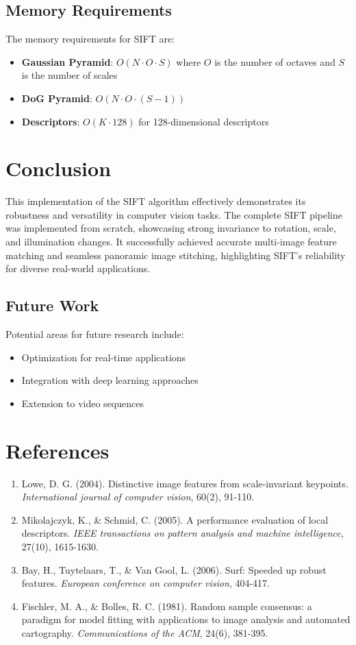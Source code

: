 \documentclass[12pt,a4paper]{article}
\begin{document}
\subsection{Memory Requirements}

The memory requirements for SIFT are:
\begin{itemize}
    \item \textbf{Gaussian Pyramid}: $O(N \cdot O \cdot S)$ where $O$ is the number of octaves and $S$ is the number of scales
    \item \textbf{DoG Pyramid}: $O(N \cdot O \cdot (S-1))$
    \item \textbf{Descriptors}: $O(K \cdot 128)$ for 128-dimensional descriptors
\end{itemize}

\section{Conclusion}

This implementation of the SIFT algorithm effectively demonstrates its robustness and versatility in computer vision tasks. The complete SIFT pipeline was implemented from scratch, showcasing strong invariance to rotation, scale, and illumination changes. It successfully achieved accurate multi-image feature matching and seamless panoramic image stitching, highlighting SIFT’s reliability for diverse real-world applications.

\subsection{Future Work}

Potential areas for future research include:
\begin{itemize}
    \item Optimization for real-time applications
    \item Integration with deep learning approaches
    \item Extension to video sequences
\end{itemize}

\section{References}

\begin{enumerate}
    \item Lowe, D. G. (2004). Distinctive image features from scale-invariant keypoints. \textit{International journal of computer vision}, 60(2), 91-110.
    \item Mikolajczyk, K., \& Schmid, C. (2005). A performance evaluation of local descriptors. \textit{IEEE transactions on pattern analysis and machine intelligence}, 27(10), 1615-1630.
    \item Bay, H., Tuytelaars, T., \& Van Gool, L. (2006). Surf: Speeded up robust features. \textit{European conference on computer vision}, 404-417.
    \item Fischler, M. A., \& Bolles, R. C. (1981). Random sample consensus: a paradigm for model fitting with applications to image analysis and automated cartography. \textit{Communications of the ACM}, 24(6), 381-395.
\end{enumerate}
\end{document}
